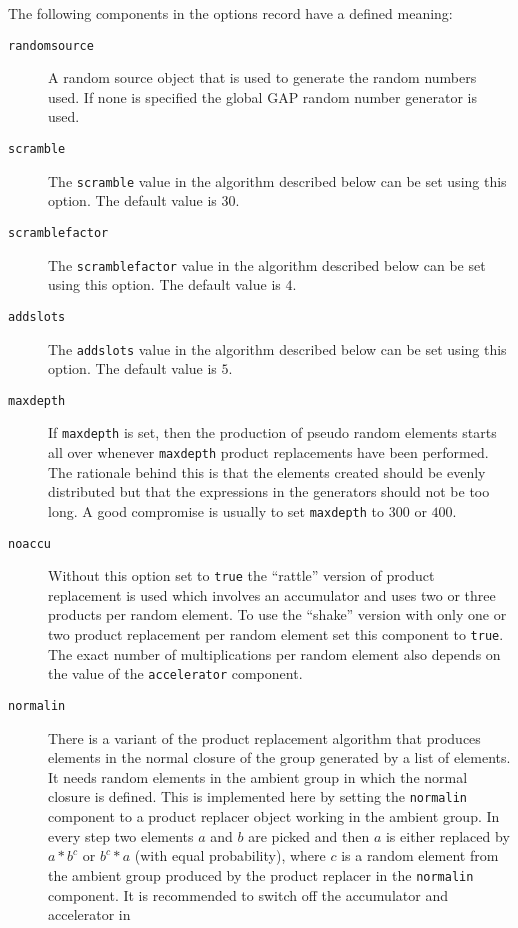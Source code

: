 \documentclass[a4paper,11pt]{report}
\begin{document}
{{{ The following components in the options record have a defined meaning: 
\begin{description}
\item[{\texttt{randomsource}}] A random source object that is used to generate the random numbers used. If
none is specified the global \textsf{GAP} random number generator is used. 
\item[{\texttt{scramble}}] The \texttt{scramble} value in the algorithm described below can be set using this option. The
default value is $30$. 
\item[{\texttt{scramblefactor}}] The \texttt{scramblefactor} value in the algorithm described below can be set using this option. The
default value is $4$. 
\item[{\texttt{addslots}}] The \texttt{addslots} value in the algorithm described below can be set using this option. The
default value is $5$. 
\item[{\texttt{maxdepth}}] If \texttt{maxdepth} is set, then the production of pseudo random elements starts all over whenever \texttt{maxdepth} product replacements have been performed. The rationale behind this is that
the elements created should be evenly distributed but that the expressions in
the generators should not be too long. A good compromise is usually to set \texttt{maxdepth} to $300$ or $400$. 
\item[{\texttt{noaccu}}] Without this option set to \texttt{true} the ``rattle'' version of product replacement is used which involves an accumulator and uses
two or three products per random element. To use the ``shake'' version with only one or two product replacement per random element set this
component to \texttt{true}. The exact number of multiplications per random element also depends on the
value of the \texttt{accelerator} component. 
\item[{\texttt{normalin}}] There is a variant of the product replacement algorithm that produces elements
in the normal closure of the group generated by a list of elements. It needs
random elements in the ambient group in which the normal closure is defined.
This is implemented here by setting the \texttt{normalin} component to a product replacer object working in the ambient group. In every
step two elements $a$ and $b$ are picked and then $a$ is either replaced by $a*b^c$ or $b^c*a$ (with equal probability), where $c$ is a random element from the ambient group produced by the product replacer in
the \texttt{normalin} component. It is recommended to switch off the accumulator and accelerator in

\end{description}}}}
\end{document}
